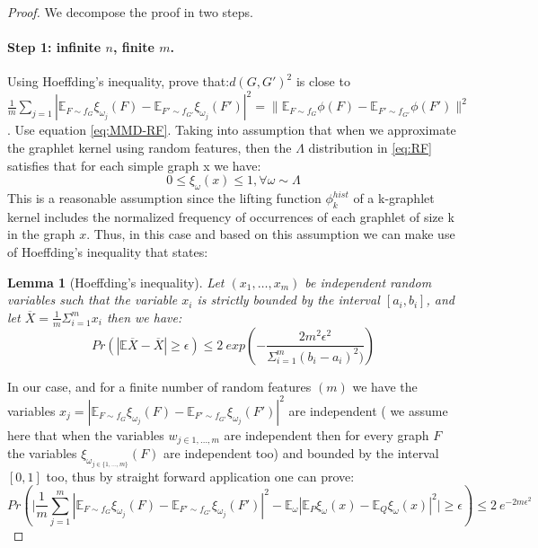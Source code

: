 \documentclass{article}
\newtheorem{lemma}{Lemma}
\begin{document}
\begin{proof}
We decompose the proof in two steps.
\paragraph{Step 1: infinite $n$, finite $m$.} Using Hoeffding's inequality, prove that:\newline  $d(G, G')^2$ is close to $\frac{1}{m} \sum_{j=1} | \mathbb{E}_{F \sim f_G} \xi_{\omega_j}(F) - \mathbb{E}_{F' \sim f_{G'}} \xi_{\omega_j}(F') |^2 = \| \mathbb{E}_{F \sim f_G} \phi(F) - \mathbb{E}_{F' \sim f_{G'}} \phi(F')\|^2$. Use equation \eqref{eq:MMD-RF}.\newline 
Taking into assumption that when we approximate the graphlet kernel using random features, then the $\Lambda$ distribution in \eqref{eq:RF} satisfies that for each simple graph x we have:
\begin{equation}
    0\leq\xi_\omega(x)\leq 1, \forall \omega \sim  \Lambda
\end{equation}
This is a reasonable assumption since the lifting function $\phi_k^{hist}$ of a k-graphlet kernel  includes the normalized frequency of occurrences of each graphlet of size k in the graph $x$. Thus, in this case and based on this assumption we can make use of Hoeffding's inequality that states:
\begin{lemma}[Hoeffding's inequality] 
Let $(x_1,\ldots, x_m)$ be independent random variables such that the variable $x_i$ is strictly bounded by the interval $[a_i , b_i]$, and let $\overline{X}=\frac{1}{m}\Sigma_{i=1}^{m}x_i$ then we have:
\begin{equation}
\label{eq:Hoeffding}
    Pr(|\mathbb{E}\overline{X}-\overline{X}|\geq \epsilon)\leq 2~ exp (-\frac{2m^2\epsilon^2}{\Sigma_{i=1}^m(b_i-a_i)^2)})
\end{equation}

\end{lemma}
In our case, and for a finite number of random features $(m)$ we have the variables $x_j=| \mathbb{E}_{F \sim f_G} \xi_{\omega_j}(F) - \mathbb{E}_{F' \sim f_{G'}} \xi_{\omega_j}(F') |^2 $ are independent ( we assume here that when the variables $w_{j\in{1,\ldots,m}}$ are independent then for every graph $F$ the variables $\xi_{\omega_{j\in\{1,\ldots,m\}}}(F)$ are independent too) and bounded by the interval $[0,1]$ too, thus by straight forward application one can prove:
\begin{equation}
    Pr(\Big|\frac{1}{m} \sum_{j=1}^m | \mathbb{E}_{F \sim f_G} \xi_{\omega_j}(F) - \mathbb{E}_{F' \sim f_{G'}} \xi_{\omega_j}(F') |^2 - \mathbb{E}_{\omega}  | \mathbb{E}_P \xi_\omega(x) - \mathbb{E}_Q \xi_\omega(x) |^2 \Big| \geq \epsilon) \leq 2~ e^{ -2m\epsilon^2}
\end{equation}


\end{proof}
\end{document}
